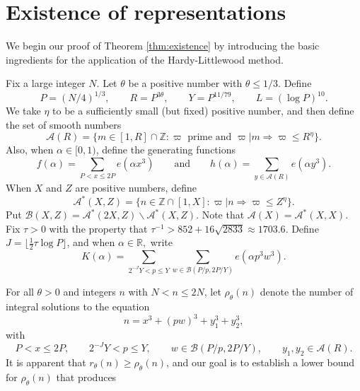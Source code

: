 \documentclass[12pt,english,reqno]{amsart}
\theoremstyle{definition}
\theoremstyle{remark}
\numberwithin{equation}{section}
\numberwithin{equation}{section}
\numberwithin{figure}{section}
\theoremstyle{plain}
\theoremstyle{plain}
\theoremstyle{plain}
\theoremstyle{plain}
\numberwithin{equation}{section}
\numberwithin{thm}{section}
\begin{document}
\section{\label{sec:Existence}Existence of representations}
We begin our proof of Theorem \ref{thm:existence} by introducing
the basic ingredients for the application of the Hardy-Littlewood
method. 
\par Fix a large integer $N$. Let $\theta$ be a positive number with
$\theta\leq1/3$. Define
\begin{equation}
P=(N/4)^{1/3},\qquad R=P^{3\theta},\qquad Y=P^{11/79},\qquad L=(\log P)^{10}.\label{eq:parameters for existence}\end{equation}
We take $\eta$ to be a sufficiently small (but fixed) positive number,
and then define the set of smooth numbers
\begin{equation}
\mathcal{A}(R)=\{m\in[1,R]\cap\mathbb{Z}:\varpi\text{ prime and }\varpi|m\Rightarrow\varpi\leq R^{\eta}\}.\label{eq:smooth numbers}\end{equation}
Also, when $\alpha\in[0,1)$, define the
generating functions
\begin{equation}
f(\alpha)=\sum_{P<x\leq2P}e(\alpha x^{3})\qquad\text{and}\qquad h(\alpha)=\sum_{y\in\mathcal{A}(R)}e(\alpha y^{3}).\label{eq:f}\end{equation}
When $X$ and $Z$ are positive numbers, define
\[
\mathcal{A}^{*}(X,Z)=\{n\in\mathbb{Z}\cap[1,X]:\varpi|n\Rightarrow\varpi\leq Z^{\eta}\}.\]
Put $\mathcal{B}(X,Z)=\mathcal{A}^{*}(2X,Z)\backslash\mathcal{A}^{*}(X,Z)$.
Note that $\mathcal{A}(X)=\mathcal{A}^{*}(X,X)$. Fix $\tau>0$ with
the property that $\tau^{-1}>852+16\sqrt{2833}\approx1703.6$. Define
$J=\lfloor\frac{1}{2}\tau\log P\rfloor$, and when $\alpha\in\mathbb{R},$
write
\begin{equation}
K(\alpha)=\sum_{2^{-J}Y<p\leq Y}\sum_{w\in\mathcal{B}(P/p,2P/Y)}e(\alpha p^{3}w^{3}).\label{eq:K}\end{equation}
\par For all $\theta>0$ and integers $n$ with $N<n\leq2N$,
let $\rho_{\theta}(n)$ denote the number of integral solutions to
the equation
\begin{equation}
n=x^{3}+(pw)^{3}+y_{1}^{3}+y_{2}^{3},\label{eq:rho(n) for existence}\end{equation}
with
\[P<x\leq2P,\qquad2^{-J}Y<p\leq Y,\qquad w\in\mathcal{B}(P/p,2P/Y),\qquad y_{1},y_{2}\in\mathcal{A}(R).\]
It is apparent that $r_{\theta}(n)\geq\rho_{\theta}(n)$, and our
goal is to establish a lower bound for $\rho_{\theta}(n)$ that produces
\end{document}

